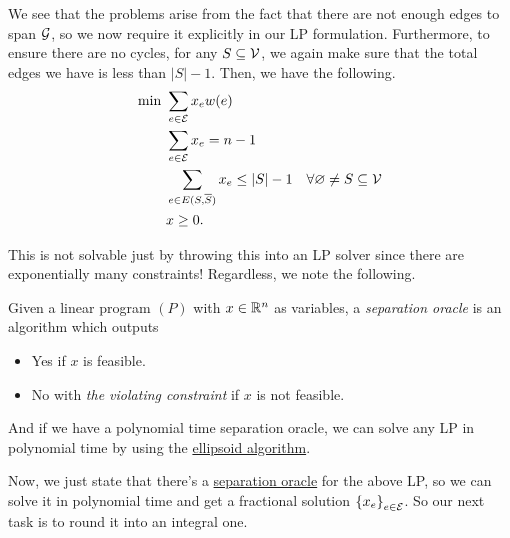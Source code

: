 We see that the problems arise from the fact that there are not enough edges to span \(\mathcal{\MakeUppercase{g}} \), so we now require it explicitly in our LP formulation. Furthermore, to ensure there are no cycles, for any \(S \subseteq \mathcal{\MakeUppercase{v}} \), we again make sure that the total edges we have is less than \(\left\vert S \right\vert - 1\). Then, we have the following.
\begin{equation}\label{eq:lec10-1}
	\begin{aligned}
		\min~ & \sum_{e\in \mathcal{\MakeUppercase{e}} } x_e w(e)                                                                                        \\
		      & \sum_{e\in \mathcal{\MakeUppercase{e}} } x_e = n-1                                                                                       \\
		      & \sum_{e\in E(S, \overline{S} )} x_e \leq \left\vert S \right\vert - 1 & \forall \varnothing \neq S \subseteq \mathcal{\MakeUppercase{v}} \\
		      & x \geq 0.
	\end{aligned}
\end{equation}

This is not solvable just by throwing this into an LP solver since there are exponentially many constraints! Regardless, we note the following.
\begin{remark}\label{rmk:separation-oracle}
	Given a linear program \((P)\) with \(x\in \mathbb{\MakeUppercase{r}} ^n\) as variables, a \emph{separation oracle} is an algorithm which outputs
	\begin{itemize}
		\item \textsf{Yes} if \(x\) is feasible.
		\item \textsf{No} with \emph{the violating constraint} if \(x\) is not feasible.
	\end{itemize}

	And if we have a polynomial time separation oracle, we can solve any LP in polynomial time by using the \href{https://en.wikipedia.org/wiki/Ellipsoid_method}{ellipsoid algorithm}.
\end{remark}

Now, we just state that there's a \hyperref[rmk:separation-oracle]{separation oracle} for the above LP, so we can solve it in polynomial time and get a fractional solution \(\left\{ x_e \right\} _{e\in \mathcal{\MakeUppercase{e}}}\). So our next task is to round it into an integral one.

